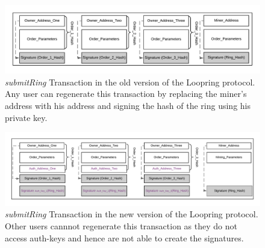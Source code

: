 \begin{figure}[t]
\centering
\includegraphics[width=0.9\linewidth]{figures/Vulnerable_Loopring.png}
\caption{\scriptsize \emph{submitRing} Transaction in the old version of the Loopring protocol. Any user can regenerate this transaction by replacing the miner's address with his address and signing the hash of the ring using his private key. \label{fig:vulnerable_loopring}}
\end{figure}
\begin{figure}[t]
\centering
\includegraphics[width=0.7\linewidth]{figures/Dual_Authoring_Loopring.png}
\caption{\scriptsize \emph{submitRing} Transaction in the new version of the Loopring protocol. Other users cannnot regenerate this transaction as they do not access auth-keys and hence are not able to create the signatures. \label{fig:not_vulnerable_loopring}}
\end{figure}

